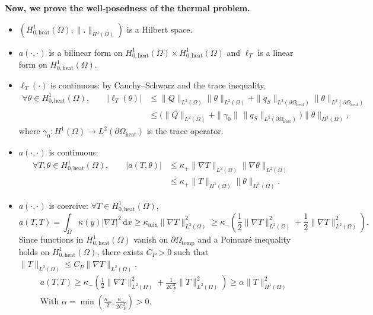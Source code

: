 \documentclass[a4paper,12pt,twoside]{report}
\begin{document}
\noindent \textbf{Now, we prove the well-posedness of the thermal problem.} 
\begin{itemize}
    \item $(H^1_{0,\text{heat}}(\Omega),\|.\|_{H^1(\Omega)})$ is a Hilbert space.
    \item $a(\cdot,\cdot)$ is a bilinear form on $H^1_{0,\text{heat}}(\Omega)\times H^1_{0,\text{heat}}(\Omega)$ and $\ell_T$ is a linear form on $H^1_{0,\text{heat}}(\Omega)$.
    \item $\ell_T(\cdot)$ is continuous: by Cauchy--Schwarz and the trace inequality,
    \begin{equation*}
    \begin{aligned}
    \forall \theta\in H^1_{0,\text{heat}}(\Omega),\qquad
    |\ell_T(\theta)|
    &\le \|Q\|_{L^2(\Omega)}\|\theta\|_{L^2(\Omega)} + \|q_S\|_{L^2(\partial\Omega_{\mathrm{heat}})}\|\theta\|_{L^2(\partial\Omega_{\mathrm{heat}})}\\
    &\le \Big(\|Q\|_{L^2(\Omega)} + \|\gamma_0\|\,\|q_S\|_{L^2(\partial\Omega_{\mathrm{heat}})}\Big)\|\theta\|_{H^1(\Omega)},
    \end{aligned}
    \end{equation*}
    where $\gamma_0: H^1(\Omega)\to L^2(\partial\Omega_{\mathrm{heat}})$ is the trace operator.
    \item $a(\cdot,\cdot)$ is continuous:
    \begin{equation*}
    \begin{aligned}
    \forall T,\theta\in H^1_{0,\text{heat}}(\Omega),\qquad
    |a(T,\theta)|
    &\le \kappa_{+}\|\nabla T\|_{L^2(\Omega)}\|\nabla\theta\|_{L^2(\Omega)}\\
    &\le \kappa_{+}\|T\|_{H^1(\Omega)}\|\theta\|_{H^1(\Omega)}.
    \end{aligned}
    \end{equation*}
    \item $a(\cdot,\cdot)$ is coercive: $\forall T\in H^1_{0,\text{heat}}(\Omega)$,
    \begin{equation*}
    a(T,T)=\int_\Omega \kappa(y)|\nabla T|^2\,\mathrm{d}x \ge \kappa_{\min}\|\nabla T\|_{L^2(\Omega)}^2 \ge \kappa_{-} \left( \frac{1}{2}  \|\nabla T\|_{L^2(\Omega)}^2 + \frac{1}{2}\|\nabla T\|_{L^2(\Omega)}^2\right).
    \end{equation*}
    Since functions in $H^1_{0,\text{heat}}(\Omega)$ vanish on $\partial\Omega_{\mathrm{temp}}$ and a Poincaré inequality holds on $H^1_{0,\text{heat}}(\Omega)$, there exists $C_P>0$ such that $\|T\|_{L^2(\Omega)}\le C_P\|\nabla T\|_{L^2(\Omega)}$. 
    \begin{equation*}
		\begin{aligned}
		& a(T,T) \ge \kappa_{-} \left( \frac{1}{2}  \|\nabla T\|_{L^2(\Omega)}^2 + \frac{1}{2C_P^2}\|T\|_{L^2(\Omega)}^2\right) \ge \alpha\|T\|_{H^1(\Omega)}^2 \\
		& \text{With } \alpha = \min\left(\frac{\kappa_{-}}{2}, \frac{\kappa_{-}}{2C_P^2}\right) > 0.
		\end{aligned}
    \end{equation*}
\end{itemize}
\end{document}
